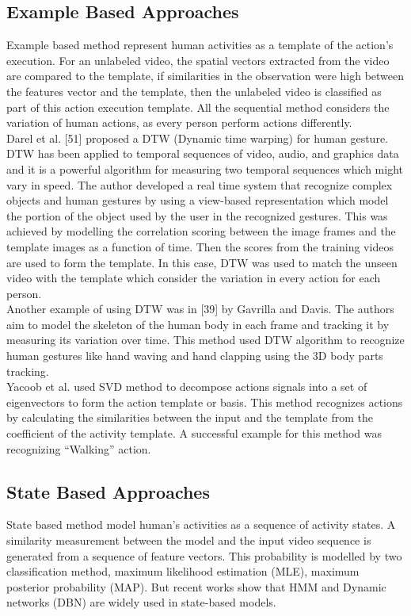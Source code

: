 \subsection{Example Based Approaches}
\hspace{5mm} Example based method represent human activities as a template of the action’s execution. For an unlabeled video, the spatial vectors extracted from the video are compared to the template, if similarities in the observation were high between the features vector and the template, then the unlabeled video is classified as part of this action execution template. All the sequential method considers the variation of human actions, as every person perform actions differently.\\ 

Darel et al. [51] proposed a DTW (Dynamic time warping) for human gesture. DTW has been applied to temporal sequences of video, audio, and graphics data and it is a powerful algorithm for measuring two temporal sequences which might vary in speed. The author developed a real time system that recognize complex objects and human gestures by using a view-based representation which model the portion of the object used by the user in the recognized gestures. This was achieved by modelling the correlation scoring between the image frames and the template images as a function of time. Then the scores from the training videos are used to form the template. In this case, DTW was used to match the unseen video with the template which consider the variation in every action for each person.\\

Another example of using DTW was in [39] by Gavrilla and Davis. The authors aim to model the skeleton of the human body in each frame and tracking it by measuring its variation over time. This method used DTW algorithm to recognize human gestures like hand waving and hand clapping using the 3D body parts tracking.\\

Yacoob et al. used SVD method to decompose actions signals into a set of eigenvectors to form the action template or basis. This method recognizes actions by calculating the similarities between the input and the template from the coefficient of the activity template. A successful example for this method was recognizing “Walking” action.


\subsection{State Based Approaches}
\hspace{5mm} State based method model human’s activities as a sequence of activity states. A similarity measurement between the model and the input video sequence is generated from a sequence of feature vectors. This probability is modelled by two classification method, maximum likelihood estimation (MLE), maximum posterior probability (MAP). But recent works show that HMM and Dynamic networks (DBN) are widely used in state-based models.\\

